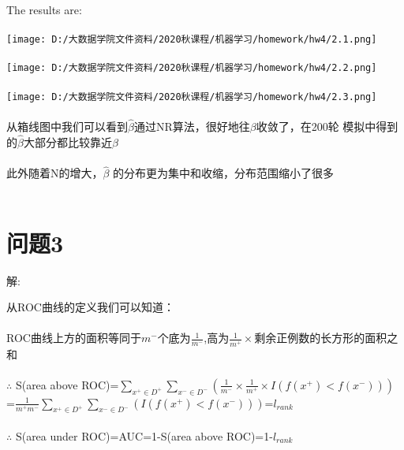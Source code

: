 \documentclass[]{article}
\begin{document}
The results are:\\\\
	\texttt{[image: D:/大数据学院文件资料/2020秋课程/机器学习/homework/hw4/2.1.png]}\\\\
	\texttt{[image: D:/大数据学院文件资料/2020秋课程/机器学习/homework/hw4/2.2.png]}\\\\
	\texttt{[image: D:/大数据学院文件资料/2020秋课程/机器学习/homework/hw4/2.3.png]}\\\\
从箱线图中我们可以看到$\hat{\beta}$通过NR算法，很好地往$\beta$收敛了，在200轮 模拟中得到的$\hat{\beta}$大部分都比较靠近$\beta$\\\\
此外随着N的增大，$\hat{\beta}$ 的分布更为集中和收缩，分布范围缩小了很多\\\\ 
\section{问题3}
\begin{flushleft}
	解:
\end{flushleft}
从ROC曲线的定义我们可以知道：\\\\
ROC曲线上方的面积等同于$m^{-}$个底为$\frac{1}{m^{-}}$,高为$\frac{1}{m^{+}}\times$剩余正例数的长方形的面积之和\\\\
$\therefore$ S(area above ROC)=$\sum_{x^+\in D^+}\sum_{x^-\in D^-}(\frac{1}{m^-}\times\frac{1}{m^+}\times I(f(x^+)<f(x^-)))$\\
=$\frac{1}{m^+m^-}\sum_{x^+\in D^+}\sum_{x^-\in D^-}(I(f(x^+)<f(x^-)))$=$l_{rank}$\\\\
$\therefore$ S(area under ROC)=AUC=1-S(area above ROC)=1-$l_{rank}$\\\\
\end{document}
